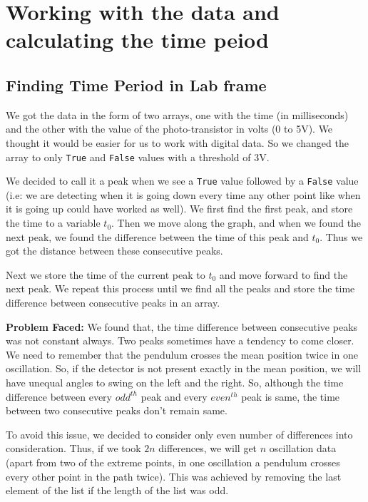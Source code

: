 \section{Working with the data and calculating the time peiod}

\subsection{Finding Time Period in Lab frame}

	We got the data in the form of two arrays, one with the time (in milliseconds) and the other with the value of the photo-transistor in volts (0 to 5V). We thought it would be easier for us to work with digital data. So we changed the array to only \texttt{True} and \texttt{False} values with a threshold of 3V.

	We decided to call it a peak when we see a \texttt{True} value followed by a \texttt{False} value (i.e: we are detecting when it is going down every time any other point like when it is going up could have worked as well). We first find the first peak, and store the time to a variable $t_0$. Then we move along the graph, and when we found the next peak, we found the difference between the time of this peak and $t_0$. Thus we got the distance between these consecutive peaks.

	Next we store the time of the current peak to $t_0$ and move forward to find the next peak. We repeat this process until we find all the peaks and store the time difference between consecutive peaks in an array.

	\vspace{3mm}

	\noindent \textbf{Problem Faced:} We found that, the time difference between consecutive peaks was not constant always. Two peaks sometimes have a tendency to come closer. We need to remember that the pendulum crosses the mean position twice in one oscillation. So, if the detector is not present exactly in the mean position, we will have unequal angles to swing on the left and the right. So, although the time difference between every $odd^{th}$ peak and every $even^{th}$ peak is same, the time between two consecutive peaks don't remain same.

	To avoid this issue, we decided to consider only even number of differences into consideration. Thus, if we took $2n$ differences, we will get $n$ oscillation data (apart from two of the extreme points, in one oscillation a pendulum crosses every other point in the path twice). This was achieved by removing the last element of the list if the length of the list was odd.

